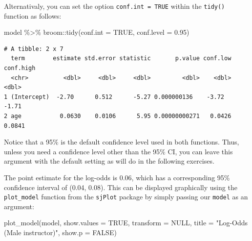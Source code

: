 \documentclass[
  letterpaper,
  DIV=11,
  numbers=noendperiod]{scrartcl}
\newenvironment{Shaded}{\begin{snugshade}}{\end{snugshade}}
\newcommand{\AttributeTok}[1]{\textcolor[rgb]{0.40,0.45,0.13}{#1}}
\newcommand{\ConstantTok}[1]{\textcolor[rgb]{0.56,0.35,0.01}{#1}}
\newcommand{\FloatTok}[1]{\textcolor[rgb]{0.68,0.00,0.00}{#1}}
\newcommand{\FunctionTok}[1]{\textcolor[rgb]{0.28,0.35,0.67}{#1}}
\newcommand{\NormalTok}[1]{\textcolor[rgb]{0.00,0.23,0.31}{#1}}
\newcommand{\SpecialCharTok}[1]{\textcolor[rgb]{0.37,0.37,0.37}{#1}}
\newcommand{\StringTok}[1]{\textcolor[rgb]{0.13,0.47,0.30}{#1}}
\begin{document}
Alternativaly, you can set the option \texttt{conf.int\ =\ TRUE} within
the \texttt{tidy()} function as follows:

\begin{Shaded}
\begin{Highlighting}[]
\NormalTok{model }\SpecialCharTok{\%\textgreater{}\%}\NormalTok{ broom}\SpecialCharTok{::}\FunctionTok{tidy}\NormalTok{(}\AttributeTok{conf.int =} \ConstantTok{TRUE}\NormalTok{, }\AttributeTok{conf.level =} \FloatTok{0.95}\NormalTok{)}
\end{Highlighting}
\end{Shaded}

\begin{verbatim}
# A tibble: 2 x 7
  term        estimate std.error statistic       p.value conf.low conf.high
  <chr>          <dbl>     <dbl>     <dbl>         <dbl>    <dbl>     <dbl>
1 (Intercept)  -2.70      0.512      -5.27 0.000000136    -3.72     -1.71  
2 age           0.0630    0.0106      5.95 0.00000000271   0.0426    0.0841
\end{verbatim}

\begin{tcolorbox}[enhanced jigsaw, colframe=quarto-callout-note-color-frame, toprule=.15mm, toptitle=1mm, opacitybacktitle=0.6, breakable, colback=white, opacityback=0, title=\textcolor{quarto-callout-note-color}{\faInfo}\hspace{0.5em}{Note}, rightrule=.15mm, bottomrule=.15mm, coltitle=black, colbacktitle=quarto-callout-note-color!10!white, leftrule=.75mm, left=2mm, arc=.35mm, bottomtitle=1mm, titlerule=0mm]

Notice that a 95\% is the default confidence level used in both
functions. Thus, unless you need a confidence level other than the 95\%
CI, you can leave this argument with the default setting as will do in
the following exercises.

\end{tcolorbox}

The point estimate for the log-odds is 0.06, which has a corresponding
95\% confidence interval of (0.04, 0.08). This can be displayed
graphically using the \texttt{plot\_model} function from the
\texttt{sjPlot} package by simply passing our \texttt{model} as an
argument:

\begin{Shaded}
\begin{Highlighting}[]
\FunctionTok{plot\_model}\NormalTok{(model, }\AttributeTok{show.values =} \ConstantTok{TRUE}\NormalTok{, }\AttributeTok{transform =} \ConstantTok{NULL}\NormalTok{,}
           \AttributeTok{title =} \StringTok{"Log{-}Odds (Male instructor)"}\NormalTok{, }\AttributeTok{show.p =} \ConstantTok{FALSE}\NormalTok{)}
\end{Highlighting}
\end{Shaded}
\end{document}
